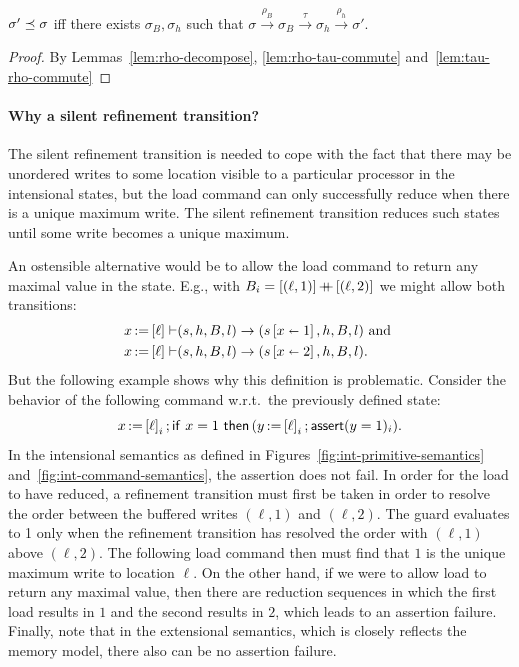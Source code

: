 \documentclass[11pt]{article}
\begin{document}
\begin{lemma}
	\label{lem:taurefines-decompose} $\sigma' \preceq \sigma$ iff there exists $\sigma_B,\sigma_h$ such that $\sigma \stackrel{\rho_B}{\rightarrow} \sigma_B \stackrel{\tau}{\rightarrow} \sigma_h \stackrel{\rho_h}{\rightarrow} \sigma'$. 
\end{lemma}

\begin{proof}
	By Lemmas~\ref{lem:rho-decompose}, \ref{lem:rho-tau-commute} and~\ref{lem:tau-rho-commute}
\end{proof}

\paragraph{Why a silent refinement transition?} The silent refinement transition is needed to cope with the fact that there may be unordered writes to some location visible to a particular processor in the intensional states, but the load command can only successfully reduce when there is a unique maximum write. The silent refinement transition reduces such states until some write becomes a unique maximum. 

An ostensible alternative would be to allow the load command to return any maximal value in the state. E.g., with $B_i = \left[(\ell,1)\right] \operatorname{+\!\!\!+} \left[(\ell,2)\right]$ we might allow both transitions: \begin{align*}
	x \operatorname{:\!=} \left[ \ell \right] \vdash & (s,h,B,l) \rightarrow (s \left[ x \shortleftarrow 1 \right],h,B,l) \text{ and }\\ 
	x \operatorname{:\!=} \left[ \ell \right] \vdash & (s,h,B,l) \rightarrow (s \left[ x \shortleftarrow 2 \right],h,B,l). 
\end{align*} But the following example shows why this definition is problematic. Consider the behavior of the following command w.r.t.~the previously defined state: \[ x \operatorname{:\!=} \left[ \ell \right]_i \operatorname{;} \operatorname{\mathsf{if\,}} x = 1 \operatorname{\mathsf{\,then\,}} (y \operatorname{:\!=} \left[ \ell \right]_i \operatorname{;} \operatorname{\mathsf{assert}}(y = 1)_i).\] In the intensional semantics as defined in Figures~\ref{fig:int-primitive-semantics} and~\ref{fig:int-command-semantics}, the assertion does not fail. In order for the load to have reduced, a refinement transition must first be taken in order to resolve the order between the buffered writes $(\ell,1)$ and $(\ell,2)$. The guard evaluates to 1 only when the refinement transition has resolved the order with $(\ell,1)$ above $(\ell,2)$. The following load command then must find that $1$ is the unique maximum write to location $\ell$. On the other hand, if we were to allow load to return any maximal value, then there are reduction sequences in which the first load results in $1$ and the second results in $2$, which leads to an assertion failure. Finally, note that in the extensional semantics, which is closely reflects the memory model, there also can be no assertion failure. 
\end{document}
